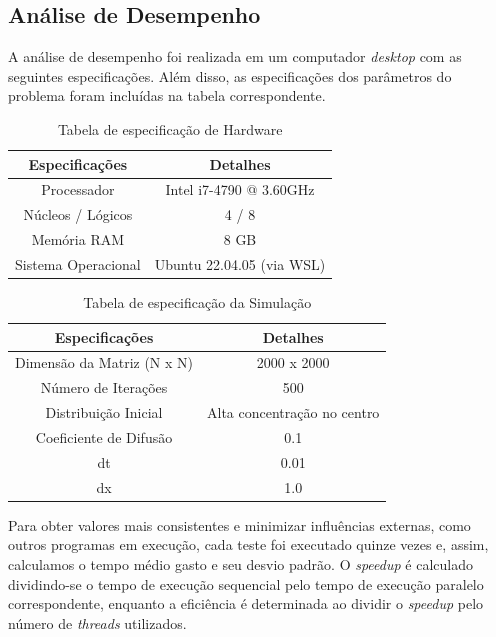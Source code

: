 \documentclass[12pt]{article}
\begin{document}
\subsection{Análise de Desempenho}

A análise de desempenho foi realizada em um computador \textit{desktop} com as seguintes especificações. Além disso, as especificações dos parâmetros do problema foram incluídas na tabela correspondente.

\begin{table}[ht]
\centering
\caption{Tabela de especificação de Hardware}
\vspace{0.3cm}
\begin{tabular}{||c c||} 
 \hline
Especificações & Detalhes \\ [0.5ex] 
 \hline\hline
 Processador & Intel i7-4790 @ 3.60GHz \\ 
 \hline
 Núcleos / Lógicos & 4 / 8  \\
 \hline
 Memória RAM & 8 GB  \\
 \hline
 Sistema Operacional & Ubuntu 22.04.05 (via WSL)   \\ 
 \hline
\end{tabular}
\end{table}

\begin{table}[ht]
\centering
\caption{Tabela de especificação da Simulação}
\vspace{0.3cm}
\begin{tabular}{||c c||} 
 \hline
Especificações & Detalhes \\ [0.5ex] 
 \hline\hline
 Dimensão da Matriz (N x N) & 2000 x 2000 \\ 
 \hline
 Número de Iterações & 500  \\
 \hline
 Distribuição Inicial & Alta concentração no centro  \\
 \hline
 Coeficiente de Difusão & 0.1   \\ 
 \hline
 dt & 0.01   \\ 
 \hline
 dx & 1.0   \\ 
 \hline
\end{tabular}
\end{table}

Para obter valores mais consistentes e minimizar influências externas, como outros programas em execução, cada teste foi executado quinze vezes e, assim, calculamos o tempo médio gasto e seu desvio padrão. O \textit{speedup} é calculado dividindo-se o tempo de execução sequencial pelo tempo de execução paralelo correspondente, enquanto a eficiência é determinada ao dividir o \textit{speedup} pelo número de \textit{threads} utilizados.
\end{document}
